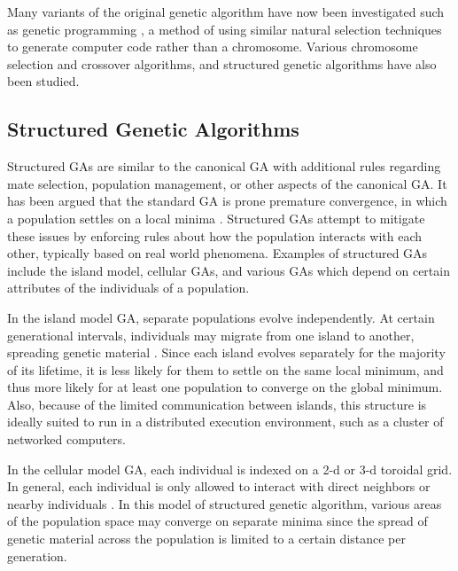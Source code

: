     Many variants of the original genetic algorithm have now been investigated
      such as genetic programming \cite{Koza1994, Banzhaf2000}, a method of using
      similar natural selection techniques to generate computer code rather than
      a chromosome. 
    Various chromosome selection and crossover algorithms, and structured
      genetic algorithms have also been studied. 

  \subsection{Structured Genetic Algorithms} %
    Structured GAs are similar to the canonical GA with additional rules regarding
      mate selection, population management, or other aspects of the canonical GA. 
    It has been argued that the standard GA is prone premature convergence, in
    which a population settles on a local minima \cite{Fogel1994}. 
    Structured GAs attempt to mitigate these issues by enforcing rules about
      how the population interacts with each other, typically based on real world
      phenomena. 
    Examples of structured GAs include the island model, cellular GAs, and
      various GAs which depend on certain attributes of the individuals of a
      population.

    In the island model GA, separate populations evolve independently. 
    At certain generational intervals, individuals may migrate from one island
      to another, spreading genetic material \cite{Whitley1999, Artyushenko2009}.
    Since each island evolves separately for the majority of its lifetime, it
      is less likely for them to settle on the same local minimum, and thus more
      likely for at least one population to converge on the global minimum. 
    Also, because of the limited communication between islands, this structure
      is ideally suited to run in a distributed execution environment, such as a
      cluster of networked computers.

    In the cellular model GA, each individual is indexed on a 2-d or 3-d toroidal
      grid. 
    In general, each individual is only allowed to interact with direct
    neighbors or nearby individuals \cite{Alba2005}. 
    In this model of structured genetic algorithm, various areas of the
      population space may converge on separate minima since the spread of
      genetic material across the population is limited to a certain distance per
      generation.

